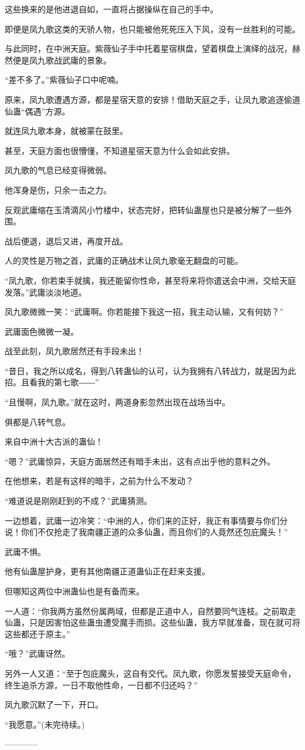 \begin{this_body}
这些换来的是他进退自如，一直将占据操纵在自己的手中。

即便是凤九歌这类的天骄人物，也只能被他死死压入下风，没有一丝胜利的可能。

与此同时，在中洲天庭。紫薇仙子手中托着星宿棋盘，望着棋盘上演绎的战况，赫然便是凤九歌战武庸的景象。

“差不多了。”紫薇仙子口中呢喃。

原来，凤九歌遭遇方源，都是星宿天意的安排！借助天庭之手，让凤九歌追逐偷道仙蛊“偶遇”方源。

就连凤九歌本身，就被蒙在鼓里。

甚至，天庭方面也很懵懂，不知道星宿天意为什么会如此安排。

凤九歌的气息已经变得微弱。

他浑身是伤，只余一击之力。

反观武庸缩在玉清滴风小竹楼中，状态完好，把转仙蛊屋也只是被分解了一些外围。

战后便退，退后又进，再度开战。

人的灵性是万物之首，武庸的正确战术让凤九歌毫无翻盘的可能。

“凤九歌，你若束手就擒，我还能留你性命，甚至将来将你遣送会中洲，交给天庭发落。”武庸淡淡地道。

凤九歌微微一笑：“武庸啊。你若能接下我这一招，我主动认输，又有何妨？”

武庸面色微微一凝。

战至此刻，凤九歌居然还有手段未出！

“昔日，我之所以成名，得到八转蛊仙的认可，认为我拥有八转战力，就是因为此招。且看我的第七歌――”

“且慢啊，凤九歌。”就在这时，两道身影忽然出现在战场当中。

俱都是八转气息。

来自中洲十大古派的蛊仙！

“嗯？”武庸惊异，天庭方面居然还有暗手未出，这有点出乎他的意料之外。

在他想来，若是有这样的暗手，之前为什么不发动？

“难道说是刚刚赶到的不成？”武庸猜测。

一边想着，武庸一边冷笑：“中洲的人，你们来的正好，我正有事情要与你们分说！你们不仅抢走了我南疆正道的众多仙蛊，而且你们的人竟然还包庇魔头！”

武庸不惧。

他有仙蛊屋护身，更有其他南疆正道蛊仙正在赶来支援。

但哪知这两位中洲蛊仙也是有备而来。

一人道：“你我两方虽然份属两域，但都是正道中人，自然要同气连枝。之前取走仙蛊，只是因害怕这些蛊虫遭受魔手而损。这些仙蛊，我方早就准备，现在就可将这些都还于原主。”

“哦？”武庸讶然。

另外一人又道：“至于包庇魔头，这自有交代。凤九歌，你愿发誓接受天庭命令，终生追杀方源，一日不取他性命，一日都不归还吗？”

凤九歌沉默了一下，开口。

“我愿意。”(未完待续。)

------------

\end{this_body}

